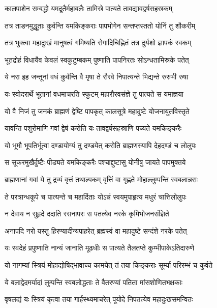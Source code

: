 \twolineshloka
{कालपाशेन सम्बद्धो यमदूतैर्महाबलैः}
{तामिस्रे पात्यते तावद्यावद्वर्षसहस्रकम्}%

\twolineshloka
{तत्र ताडनमुद्धूताः कुर्वन्ति यमकिङ्कराः}
{पापभोगेन सन्तप्तस्ततो योनिं तु शौकरीम्}%

\twolineshloka
{तत्र भुक्त्वा महादुःखं मानुषत्वं गमिष्यति}
{रोगादिचिह्नितं तत्र दुर्यशो ज्ञापकं स्वकम्}%

\twolineshloka
{भूतद्रोहं विधायैव केवलं स्वकुटुम्बकम्}
{पुष्णाति पापनिरतः सोऽन्धतामिस्रके पतेत्}%

\twolineshloka
{ये नरा इह जन्तूनां वधं कुर्वन्ति वै मृषा}
{ते रौरवे निपात्यन्ते भिद्यन्ते रुरुभी रुषा}%

\twolineshloka
{यः स्वोदरार्थे भूतानां वधमाचरति स्फुटम्}
{महारौरवसंज्ञे तु पात्यते स यमाज्ञया}%

\twolineshloka
{यो वै निजं तु जनकं ब्राह्मणं द्वेष्टि पापकृत्}
{कालसूत्रे महादुष्टे योजनायुतविस्तृते}%

\twolineshloka
{यावन्ति पशुरोमाणि गवां द्वेषं करोति यः}
{तावद्वर्षसहस्राणि पच्यते यमकिङ्करैः}%

\twolineshloka
{यो भूमौ भूपतिर्भूत्वा दण्डायोग्यं तु दण्डयेत्}
{करोति ब्राह्मणस्यापि देहदण्डं च लोलुपः}%

\twolineshloka
{स सूकरमुखैर्दुष्टैः पीड्यते यमकिङ्करैः}
{पश्चाद्दुष्टासु योनीषु जायते पापमुक्तये}%

\twolineshloka
{ब्राह्मणानां गवां ये तु द्रव्यं वृत्तं तथाल्पकम्}
{वृत्तिं वा गृह्णते मोहाल्लुम्पन्ति स्वबलान्नराः}%

\twolineshloka
{ते परत्रान्धकूपे च पात्यन्ते च महार्दिताः}
{योऽन्नं स्वयमुपाहृत्य मधुरं चात्तिलोलुपः}%

\twolineshloka
{न देवाय न सुहृदे ददाति रसनापरः}
{स पतत्येव नरके कृमिभोजनसंज्ञिते}%

\twolineshloka
{अनापदि नरो यस्तु हिरण्यादीन्यपाहरेत्}
{ब्रह्मस्वं वा महादुष्टे सन्दंशे नरके पतेत्}%

\twolineshloka
{यः स्वदेहं प्रपुष्णाति नान्यं जानाति मूढधीः}
{स पात्यते तैलतप्ते कुम्भीपाकेऽतिदारुणे}%

\twolineshloka
{यो नागम्यां स्त्रियं मोहाद्योषिद्भावाच्च कामयेत्}
{तं तया किङ्कराः सूर्म्या परिरम्भं च कुर्वते}%

\twolineshloka
{ये बलाद्वेदमर्यादां लुम्पन्ति स्वबलोद्धताः}
{ते वैतरण्यां पतिता मांसशोणितभक्षकाः}%

\twolineshloka
{वृषलद्यं यः स्त्रियं कृत्वा तया गार्हस्थ्यमाचरेत्}
{पूयोदे निपतत्येव महादुःखसमन्वितः}%

